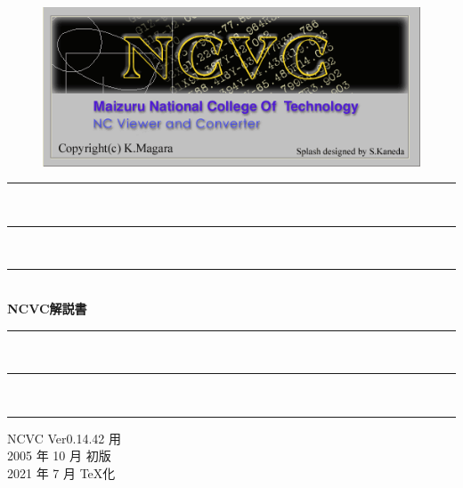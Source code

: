 
\vspace*{4zh}
\begin{figure}[H]
\centering
\includegraphics[scale=1.2]{logo.png}
\end{figure}

\vspace*{3zh}
\begin{center}
    \rule{6cm}{0.2zw}\\[-0.5zh]
    \rule{5cm}{0.1zw}\\[-0.5zh]
    \rule{4cm}{0.05zw}\\[1zh]
    {\Large \textbf{NCVC解説書}}\\
    \rule{4cm}{0.05zw}\\[-0.5zh]
    \rule{5cm}{0.1zw}\\[-0.5zh]
    \rule{6cm}{0.2zw}

    \vspace*{8cm}
    NCVC Ver0.14.42 用\\
    2005 年 10 月 初版\\
    2021 年  7 月 \TeX 化
\end{center}
